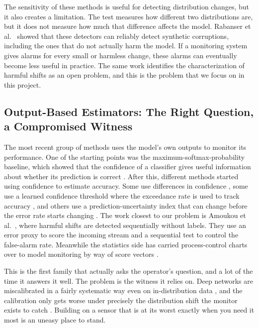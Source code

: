 \documentclass[graybox]{SNmult}
\begin{document}
The sensitivity of these methods is useful for detecting distribution changes, but it also creates a limitation. The test measures how different two distributions are, but it does not measure how much that difference affects the model. Rabanser et al.\
\cite{rabanser2019failing} showed that these detectors can reliably detect synthetic corruptions, including the ones that do not actually harm the model. If a monitoring system gives alarms for every small or harmless change, these alarms can eventually become less useful in practice. The same work identifies the characterization of harmful shifts as an open problem, and this is the problem that we focus on in this project.

\subsection{Output-Based Estimators: The Right Question, a Compromised Witness}

The most recent group of methods uses the model's own outputs to monitor its performance. One of the starting points was the maximum-softmax-probability baseline, which showed that the confidence of a classifier gives useful information about whether its prediction is correct \cite{hendrycks2017baseline}. After this, different methods started using confidence to estimate accuracy. Some use differences in confidence \cite{guillory2021doc}, some use a learned confidence threshold where the exceedance rate is used to track accuracy \cite{garg2022atc}, and others use a prediction-uncertainty index that can change before the error rate starts changing \cite{pudd2025}. The work closest to our problem is Amoukou et al.\ \cite{amoukou2024sequential}, where harmful shifts are detected sequentially without labels. They use an error proxy to score the incoming stream and a sequential test to control the false-alarm rate.
 Meanwhile the
statistics side has carried process-control charts over to model
monitoring by way of score vectors \cite{zhang2023score}.

This is the first family that actually asks the operator's question, and
a lot of the time it answers it well. The problem is the witness it
relies on. Deep networks are miscalibrated in a fairly systematic way
even on in-distribution data \cite{guo2017calibration}, and the
calibration only gets worse under precisely the distribution shift the
monitor exists to catch \cite{ovadia2019trust}. Building on a sensor
that is at its worst exactly when you need it most is an uneasy place to
stand.
\end{document}
